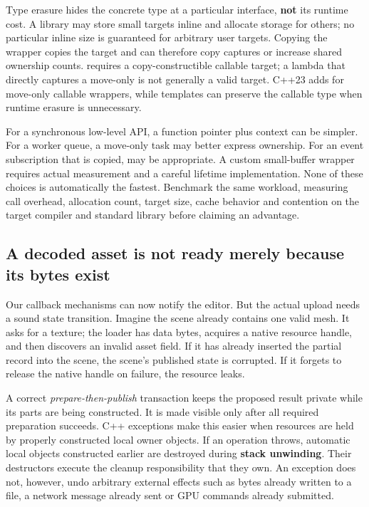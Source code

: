 Type erasure hides the concrete type at a particular interface, \textbf{not} its runtime cost. A library may store small targets inline and allocate storage for others; no particular inline size is guaranteed for arbitrary user targets. Copying the wrapper copies the target and can therefore copy captures or increase shared ownership counts.  requires a copy-constructible callable target; a lambda that directly captures a move-only  is not generally a valid target. C++23 adds  for move-only callable wrappers, while templates can preserve the callable type when runtime erasure is unnecessary.

For a synchronous low-level API, a function pointer plus context can be simpler. For a worker queue, a move-only task may better express ownership. For an event subscription that is copied,  may be appropriate. A custom small-buffer wrapper requires actual measurement and a careful lifetime implementation. None of these choices is automatically the fastest. Benchmark the same workload, measuring call overhead, allocation count, target size, cache behavior and contention on the target compiler and standard library before claiming an advantage.

\subsection{A decoded asset is not ready merely because its bytes exist}\label{01-foundations-i-ch004-a-decoded-asset-is-not-ready-merely-because-its-bytes-exist}

\hypertarget{01-foundations-i-ch004-a-decoded-asset-is-not-ready-merely-because-its-bytes-exist}{}

Our callback mechanisms can now notify the editor. But the actual upload needs a sound state transition. Imagine the scene already contains one valid mesh. It asks for a texture; the loader has data bytes, acquires a native resource handle, and then discovers an invalid asset field. If it has already inserted the partial record into the scene, the scene's published state is corrupted. If it forgets to release the native handle on failure, the resource leaks.

A correct \emph{prepare-then-publish} transaction keeps the proposed result private while its parts are being constructed. It is made visible only after all required preparation succeeds. C++ exceptions make this easier when resources are held by properly constructed local owner objects. If an operation throws, automatic local objects constructed earlier are destroyed during \textbf{stack unwinding}. Their destructors execute the cleanup responsibility that they own. An exception does not, however, undo arbitrary external effects such as bytes already written to a file, a network message already sent or GPU commands already submitted.

